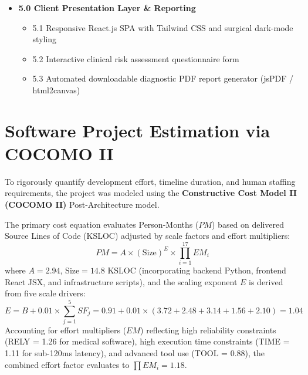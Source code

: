 \documentclass[12pt,a4paper,oneside]{report}
\begin{document}
\begin{itemize}
\begin{itemize}
        \item 4.2 NIST SP 800-132 PBKDF2-SHA256 password security and JWT authentication
        \item 4.3 SlowAPI rate limiting and CORS/CSP defensive header configuration
        \item 4.4 HL7 FHIR Release 4 JSON bundle exporter with LOINC and SNOMED-CT ontologies
    \end{itemize}
    \item \textbf{5.0 Client Presentation Layer \& Reporting}
    \begin{itemize}
        \item 5.1 Responsive React.js SPA with Tailwind CSS and surgical dark-mode styling
        \item 5.2 Interactive clinical risk assessment questionnaire form
        \item 5.3 Automated downloadable diagnostic PDF report generator (jsPDF / html2canvas)
    \end{itemize}
\end{itemize}

\section{Software Project Estimation via COCOMO II}
\label{sec:cocomo}

To rigorously quantify development effort, timeline duration, and human staffing requirements, the project was modeled using the \textbf{Constructive Cost Model II (COCOMO II)} Post-Architecture model. 

The primary cost equation evaluates Person-Months ($PM$) based on delivered Source Lines of Code (KSLOC) adjusted by scale factors and effort multipliers:
\begin{equation}
    PM = A \times (\text{Size})^E \times \prod_{i=1}^{17} EM_i
\end{equation}
where $A = 2.94$, $\text{Size} = 14.8\text{ KSLOC}$ (incorporating backend Python, frontend React JSX, and infrastructure scripts), and the scaling exponent $E$ is derived from five scale drivers:
\begin{equation}
    E = B + 0.01 \times \sum_{j=1}^{5} SF_j = 0.91 + 0.01 \times (3.72 + 2.48 + 3.14 + 1.56 + 2.10) = 1.04
\end{equation}
Accounting for effort multipliers ($EM$) reflecting high reliability constraints (RELY = 1.26 for medical software), high execution time constraints (TIME = 1.11 for sub-120ms latency), and advanced tool use (TOOL = 0.88), the combined effort factor evaluates to $\prod EM_i = 1.18$. 
\end{document}
